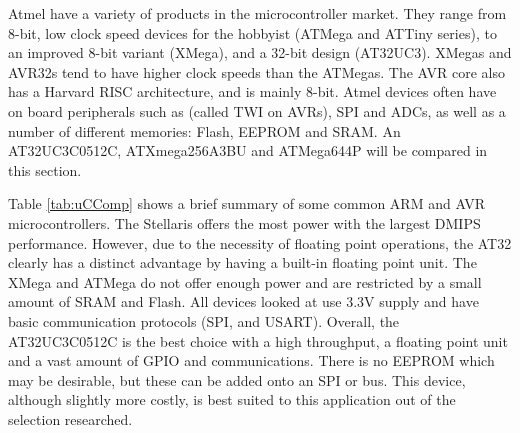 Atmel have a variety of products in the microcontroller market. They range from 8-bit, low clock speed devices for the hobbyist (ATMega and ATTiny series), to an improved 8-bit variant (XMega), and a 32-bit design (AT32UC3). XMegas and AVR32s tend to have higher clock speeds than the ATMegas. The AVR core also has a Harvard RISC architecture, and is mainly 8-bit. Atmel devices often have on board peripherals such as \itc (called TWI on AVRs), SPI and ADCs, as well as a number of different memories: Flash, EEPROM and SRAM. An AT32UC3C0512C, ATXmega256A3BU and ATMega644P will be compared in this section. 


Table \ref{tab:uCComp} shows a brief summary of some common ARM and AVR microcontrollers. The Stellaris offers the most power with the largest DMIPS performance. However, due to the necessity of floating point operations, the AT32 clearly has a distinct advantage by having a built-in floating point unit. The XMega and ATMega do not offer enough power and are restricted by a small amount of SRAM and Flash. All devices looked at use 3.3V supply and have basic communication protocols (SPI, \itc and USART). Overall, the AT32UC3C0512C is the best choice with a high throughput, a floating point unit and a vast amount of GPIO and communications. There is no EEPROM which may be desirable, but these can be added onto an SPI or \itc bus. This device, although slightly more costly, is best suited to this application out of the selection researched.

